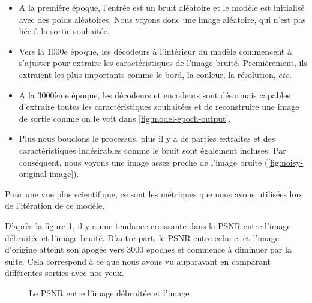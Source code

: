 \documentclass[
  11pt,
  dvipsnames]{article}
\providecommand{\tightlist}{%
  \setlength{\itemsep}{0pt}\setlength{\parskip}{0pt}}
\begin{document}
\begin{itemize}
\tightlist
\item
  A la première époque, l'entrée est un bruit aléatoire et le modèle est initialisé avec des poids aléatoires. Nous voyons donc une image aléatoire, qui n'est pas liée à la sortie souhaitée.
\item
  Vers la 1000e époque, les décodeurs à l'intérieur du modèle commencent à s'ajuster pour extraire les caractéristiques de l'image bruité. Premièrement, ils extraient les plus importants comme le bord, la couleur, la résolution, \(etc.\)
\item
  A la 3000ème époque, les décodeurs et encodeurs sont désormais capables d'extraire toutes les caractéristiques souhaitées et de reconstruire une image de sortie comme on le voit dans \ref{fig:model-epoch-output}.
\item
  Plus nous bouclons le processus, plus il y a de parties extraites et des caractéristiques indésirables comme le bruit sont également incluses. Par conséquent, nous voyons une image assez proche de l'image bruité (\ref{fig:noisy-original-image}).
\end{itemize}

Pour une vue plus scientifique, ce sont les métriques que nous avons utilisées lors de l'itération de ce modèle.

D'après la figure \ref{fig:model-psnr}, il y a une tendance croissante dans le PSNR entre l'image débruitée et l'image bruité. D'autre part, le PSNR entre celui-ci et l'image d'origine atteint son apogée vers 3000 epoches et commence à diminuer par la suite. Cela correspond à ce que nous avons vu auparavant en comparant différentes sorties avec nos yeux.

\begin{figure}

{\centering {}

}

\caption{Le PSNR entre l'image débruitée et l'image}\label{fig:model-psnr}
\end{figure}
\end{document}
